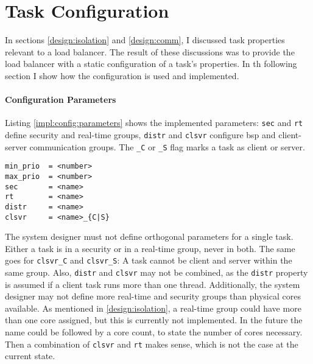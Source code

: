 \pagebreak
\section{Task Configuration}
\label{impl:config}

In sections \ref{design:isolation} and \ref{design:comm}, I discussed
task properties relevant to a load balancer.
The result of these discussions was to provide the load balancer with a static
configuration of a task's properties.
In th following section I show how the configuration is used and implemented.

\paragraph{Configuration Parameters}
Listing \ref{impl:config:parameters} shows the implemented parameters:
\texttt{sec} and \texttt{rt} define security and real-time groups,
\texttt{distr} and \texttt{clsvr} configure \gls{bsp} and client-server
communication groups.
The \texttt{\_C} or \texttt{\_S} flag marks a task as client or server.

\begin{lstlisting}[language={[5.2]Lua}, caption={Implemented set of
configuration parameters.},label={impl:config:parameters}]
min_prio  = <number>
max_prio  = <number>
sec       = <name>
rt        = <name>
distr     = <name>
clsvr     = <name>_{C|S}
\end{lstlisting}

The system designer must not define orthogonal parameters for
a single task.
Either a task is in a security or in a real-time group, never in both.
The same goes for \texttt{clsvr\_C} and \texttt{clsvr\_S}:
A task cannot be client and server within the same group.
Also, \texttt{distr} and \texttt{clsvr} may not be combined, as the
\texttt{distr} property is assumed if a client task runs more than one thread.
Additionally, the system designer may not define more real-time and security
groups than physical cores available.
As mentioned in \ref{design:isolation}, a real-time group could have more than
one core assigned, but this is currently not implemented.
In the future the name could be followed by a core count, to state the number
of cores necessary.
Then a combination of \texttt{clsvr} and \texttt{rt} makes sense, which is not
the case at the current state.

